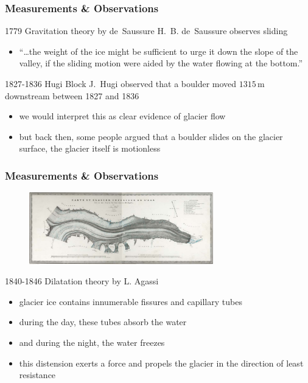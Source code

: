 \documentclass[hide notes,intlimits]{beamer}
\begin{document}
\begin{frame}
  \frametitle{Measurements \& Observations}
    \begin{block}{1779 Gravitation theory by de~Saussure}
      H.~B. de~Saussure observes sliding
      \begin{itemize}
        \item ``\ldots the weight of the ice might be sufficient to urge it down the slope of the valley, if the sliding motion were aided by the water flowing at the bottom.''
      \end{itemize}
    \end{block}
    \begin{block}{1827-1836 Hugi Block}
      J.~Hugi observed that a boulder moved $1315\,\text{m}$ downstream between 1827 and 1836
      \begin{itemize}
        \item we would interpret this as clear evidence of glacier flow
        \item but back then, some people argued that a boulder slides on the glacier surface, the glacier itself is motionless
      \end{itemize}
    \end{block}
\end{frame}

\begin{frame}
  \frametitle{Measurements \& Observations}
  \begin{figure}
    \includegraphics[width=8cm]{figures/agassi}%
  \end{figure}
    \begin{block}{1840-1846 Dilatation theory by L. Agassi}
      \begin{itemize}
        \item glacier ice contains innumerable fissures and capillary tubes
        \item during the day, these tubes absorb the water
        \item and during the night, the water freezes
        \item this distension exerts a force and propels the glacier in the direction of least resistance
      \end{itemize}
    \end{block}
\end{frame}
\end{document}
